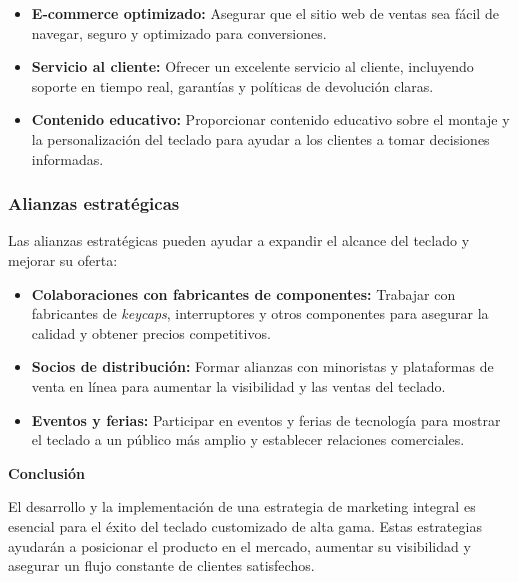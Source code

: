 \begin{itemize}
    \item \textbf{E-commerce optimizado:} Asegurar que el sitio web de ventas sea fácil de navegar, seguro y optimizado para conversiones.
    \item \textbf{Servicio al cliente:} Ofrecer un excelente servicio al cliente, incluyendo soporte en tiempo real, garantías y políticas de devolución claras.
    \item \textbf{Contenido educativo:} Proporcionar contenido educativo sobre el montaje y la personalización del teclado para ayudar a los clientes a tomar decisiones informadas.
\end{itemize}

\subsubsection{Alianzas estratégicas}

Las alianzas estratégicas pueden ayudar a expandir el alcance del teclado y mejorar su oferta:

\begin{itemize}
    \item \textbf{Colaboraciones con fabricantes de componentes:} Trabajar con fabricantes de \textit{keycaps}, interruptores y otros componentes para asegurar la calidad y obtener precios competitivos.
    \item \textbf{Socios de distribución:} Formar alianzas con minoristas y plataformas de venta en línea para aumentar la visibilidad y las ventas del teclado.
    \item \textbf{Eventos y ferias:} Participar en eventos y ferias de tecnología para mostrar el teclado a un público más amplio y establecer relaciones comerciales.
\end{itemize}

\textbf{Conclusión}

El desarrollo y la implementación de una estrategia de marketing integral es esencial para el éxito del teclado customizado de alta gama. Estas estrategias ayudarán a posicionar el producto en el mercado, aumentar su visibilidad y asegurar un flujo constante de clientes satisfechos.
